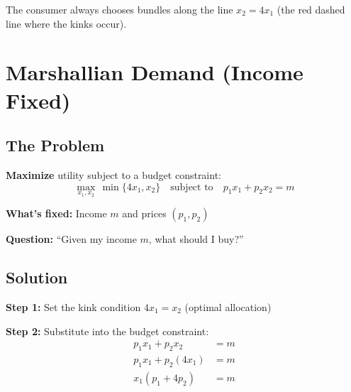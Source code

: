 \documentclass[11pt]{article}
\begin{document}
\begin{center}
\end{center}

The consumer always chooses bundles along the line $x_2 = 4x_1$ (the red dashed line where the kinks occur).

\section{Marshallian Demand (Income Fixed)}

\subsection{The Problem}

\textbf{Maximize} utility subject to a budget constraint:
\[
\max_{x_1, x_2} \, \min\{4x_1, x_2\} \quad \text{subject to} \quad p_1 x_1 + p_2 x_2 = m
\]

\textbf{What's fixed:} Income $m$ and prices $(p_1, p_2)$

\textbf{Question:} ``Given my income $m$, what should I buy?''

\subsection{Solution}

\textbf{Step 1:} Set the kink condition $4x_1 = x_2$ (optimal allocation)

\textbf{Step 2:} Substitute into the budget constraint:
\begin{align*}
p_1 x_1 + p_2 x_2 &= m \\
p_1 x_1 + p_2(4x_1) &= m \\
x_1(p_1 + 4p_2) &= m
\end{align*}
\end{document}
